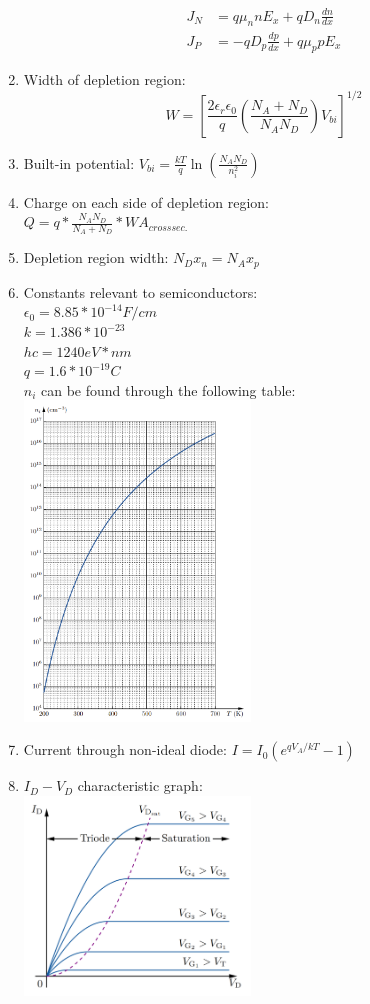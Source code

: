 \documentclass[twocolumn]{article}
\begin{document}
\begin{enumerate}
\begin{align*}
        J_N &= q\mu_n n E_x + qD_n \frac{dn}{dx} \\
        J_P &= -qD_p \frac{dp}{dx} + q\mu_p p E_x
    \end{align*}
    \item Width of depletion region: 
    \[W = \left[\frac{2\epsilon_r \epsilon_0}{q} \left(\frac{N_A + N_D}{N_A N_D}\right) V_{bi}\right]^{1/2}\]
    \item Built-in potential: $V_{bi} = \frac{kT}{q}\ln{\left(\frac{N_AN_D}{n_i^2}\right)}$
    \item Charge on each side of depletion region: \\$Q=q*\frac{N_A N_D}{N_A+N_D}*WA_{cross sec.}$
    \item Depletion region width: $N_Dx_n=N_Ax_p$
    \item Constants relevant to semiconductors: \\
    $\epsilon_0=8.85*10^{-14} F/cm$\\
    $k=1.386*10^{-23}$\\
    $hc=1240eV*nm$\\
    $q=1.6*10^{-19}C$\\
    $n_i$ can be found through the following table:\\
    \includegraphics[width=6cm]{images/ni_T_graph.png}
    \item Current through non-ideal diode: $I = I_0(e^{qV_A / kT} - 1)$
    \item $I_D-V_D$ characteristic graph: \\
        \includegraphics[width=6cm]{images/idvdcharacteristics.png}

\end{enumerate}
\end{document}
